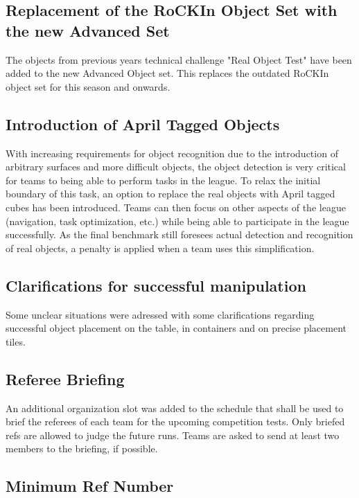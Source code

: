 \subsection{Replacement of the RoCKIn Object Set with the new Advanced Set}

The objects from previous years technical challenge "Real Object Test" have been added to the new Advanced Object set. This replaces the outdated RoCKIn object set for this season and onwards.

\subsection{Introduction of April Tagged Objects}

With increasing requirements for object recognition due to the introduction of arbitrary surfaces and more difficult objects, the object detection is very critical for teams to being able to perform tasks in the league. To relax the initial boundary of this task, an option to replace the real objects with April tagged cubes has been introduced. Teams can then focus on other aspects of the league (navigation, task optimization, etc.) while being able to participate in the league successfully. As the final benchmark still foresees actual detection and recognition of real objects, a penalty is applied when a team uses this simplification.

\subsection{Clarifications for successful manipulation}

Some unclear situations were adressed with some clarifications regarding successful object placement on the table, in containers and on precise placement tiles.

\subsection{Referee Briefing}

An additional organization slot was added to the schedule that shall be used to brief the referees of each team for the upcoming competition tests. Only briefed refs are allowed to judge the future runs.
Teams are asked to send at least two members to the briefing, if possible.

\subsection{Minimum Ref Number}

